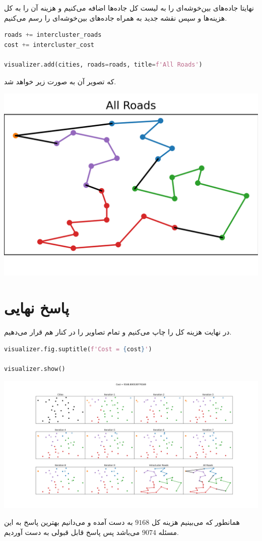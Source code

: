 \documentclass[a4paper, 12pt]{article}
\theoremstyle{definition}
\begin{document}
نهایتا جاده‌های بین‌خوشه‌ای را به لیست کل جاده‌ها اضافه می‌کنیم و هزینه آن را به کل هزینه‌ها و سپس نقشه جدید به همراه جاده‌های بین‌خوشه‌ای را رسم می‌کنیم.

\LTR
\begin{lstlisting}[language=Python]
roads += intercluster_roads
cost += intercluster_cost

visualizer.add(cities, roads=roads, title=f'All Roads')
\end{lstlisting}
\RTL

که تصویر آن به صورت زیر خواهد شد.

\begin{center}
    \includegraphics[width=.5\textwidth]{1/11.png}
\end{center}

\section{پاسخ نهایی}

در نهایت هزینه کل را چاپ می‌کنیم و تمام تصاویر را در کنار هم قرار می‌دهیم.

\LTR
\begin{lstlisting}[language=Python]
visualizer.fig.suptitle(f'Cost = {cost}')

visualizer.show()    
\end{lstlisting}
\RTL


\begin{center}
    \includegraphics[width=\textwidth]{1/all.png}
\end{center}

همانطور که می‌بینیم هزینه کل
$9168$
به دست آمده و می‌دانیم بهترین پاسخ به این مسئله
$9074$
می‌باشد پس پاسخ قابل قبولی به دست آوردیم.
\end{document}
